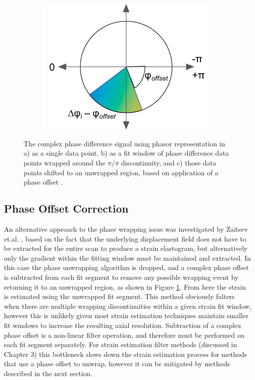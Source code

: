 \begin{figure}
\begin{subfigure}{0.25\textwidth}
		\includegraphics[width=\textwidth]{figures/cplx_segment_shifted.png}
	\end{subfigure}
	\label{phase_offset}
	\caption{The complex phase difference signal using phasor representation in a) as a single data point, b) as a fit window of phase difference data points wrapped around the $\pi/\pi$ discontinuity, and c) those data points shifted to an unwrapped region, based on application of a phase offset \cite{zaitsev_hybrid_2016}.}
\end{figure}

\subsection{Phase Offset Correction}
An alternative approach to the phase wrapping issue was investigated by Zaitsev et.al. \cite{zaitsev_hybrid_2016}, based on the fact that the underlying displacement field does not have to be extracted for the entire scan to produce a strain elastogram, but alternatively only the gradient within the fitting window must be maintained and extracted. In this case the phase unwrapping algorithm is dropped, and a complex phase offset is subtracted from each fit segment to remove any possible wrapping event by returning it to an unwrapped region, as shown in Figure \ref{phase_offset}. From here the strain is estimated using the unwrapped fit segment. This method obviously falters when there are multiple wrapping discontinuities within a given strain fit window, however this is unlikely given most strain estimation techniques maintain smaller fit windows to increase the resulting axial resolution.
Subtraction of a complex phase offset is a non-linear filter operation, and therefore must be performed on each fit segment separately. For strain estimation filter methods (discussed in Chapter 3) this bottleneck slows down the strain estimation process for methods that use a phase offset to unwrap, however it can be mitigated by methods described in the next section.

